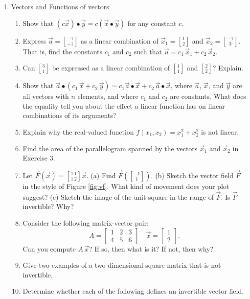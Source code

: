 \documentclass[11pt]{article}
\begin{document}
\begin{enumerate}
  \item Vectors and Functions of vectors
    \begin{enumerate}
      \item Show that $(c \vec{x}) \bullet \vec{y}=c(\vec{x}\bullet \vec{y})$ for any constant $c$.
      \item Express $\vec{u}={-1\brack -1}$ as a linear combination of $\vec{x}_1 = {1\brack 2}$ and $\vec{x}_2 = {-1\brack 3}$. That is, find the constants $c_1$ and $c_2$ such that $\vec{u} = c_1\, \vec{x}_1+ c_2\, \vec{x}_2$.	
      \item Can ${3\brack 1}$ be expressed as a linear combination of ${1 \brack 1}$ and ${2\brack 2}$? Explain.
      \item Show that $\vec{a} \bullet (c_1\, \vec{x} + c_2\, \vec{y})=c_1 \vec{a}\bullet \vec{x} + c_2 \, \vec{a}\bullet \vec{x}$, where $\vec{a}$, $\vec{x}$, and $\vec{y}$ are all vectors with $n$ elements, and where $c_1$ and $c_2$ are constants. What does the equality tell you about the effect a linear function has on linear combinations of its arguments?
      \item Explain why the real-valued function $f(x_1, x_2) = x_1^2 + x_2^2$ is not linear.
      \item Find the area of the parallelogram spanned by the vectors $\vec{x}_1$ and $\vec{x}_2$ in Exercise 3.
      \item Let $\vec{F}(\vec{x}) = {1 \ 1 \brack 1 \ 2}\vec{x}$.
        (a) Find $\vec{F}({-1\brack 1})$. (b) Sketch the vector field $\vec{F}$ in the style of Figure \ref{fig:vf}. What kind of movement does your plot suggest? (c) Sketch the image of the unit square in the range of $\vec{F}$. Is $\vec{F}$ invertible? Why?
      \item Consider the following matrix-vector pair:
        \[
          A = 
          \begin{bmatrix}
            1 & 2 & 3 \\ 4 & 5 & 6			
          \end{bmatrix}
          \quad
          \vec{x}
          =
          \begin{bmatrix}
            1 \\ 2
          \end{bmatrix}.
        \]
        Can you compute $A\, \vec{x}$? If so, then what is it? If not, then why?
      \item Give two examples of a two-dimensional square matrix that is not invertible.
      \item Determine whether each of the following defines an invertible vector field.

\end{enumerate}
\end{enumerate}
\end{document}
